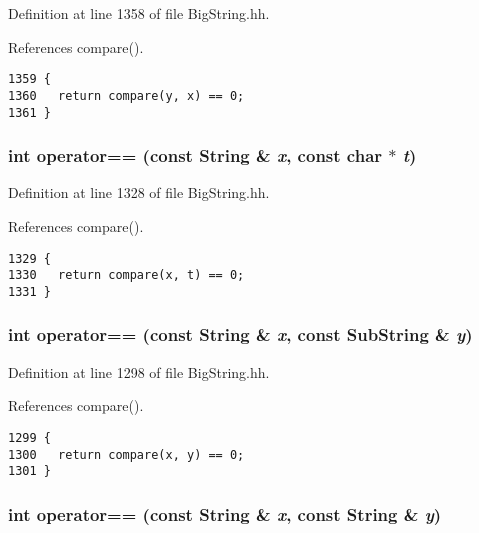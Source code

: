 Definition at line 1358 of file Big\-String.hh.

References compare().



\footnotesize\begin{verbatim}1359 {
1360   return compare(y, x) == 0; 
1361 }
\end{verbatim}\normalsize 
{}
\subsubsection{\setlength{\rightskip}{0pt plus 5cm}int operator== (const {\bf String} \& {\em x}, const char $\ast$ {\em t})\hspace{0.3cm}{\tt  [inline]}}\label{BigString_8hh_a98}




Definition at line 1328 of file Big\-String.hh.

References compare().



\footnotesize\begin{verbatim}1329 {
1330   return compare(x, t) == 0; 
1331 }
\end{verbatim}\normalsize 
{}
\subsubsection{\setlength{\rightskip}{0pt plus 5cm}int operator== (const {\bf String} \& {\em x}, const {\bf Sub\-String} \& {\em y})\hspace{0.3cm}{\tt  [inline]}}\label{BigString_8hh_a92}




Definition at line 1298 of file Big\-String.hh.

References compare().



\footnotesize\begin{verbatim}1299 {
1300   return compare(x, y) == 0; 
1301 }
\end{verbatim}\normalsize 
{}
\subsubsection{\setlength{\rightskip}{0pt plus 5cm}int operator== (const {\bf String} \& {\em x}, const {\bf String} \& {\em y})\hspace{0.3cm}{\tt  [inline]}}\label{BigString_8hh_a86}





